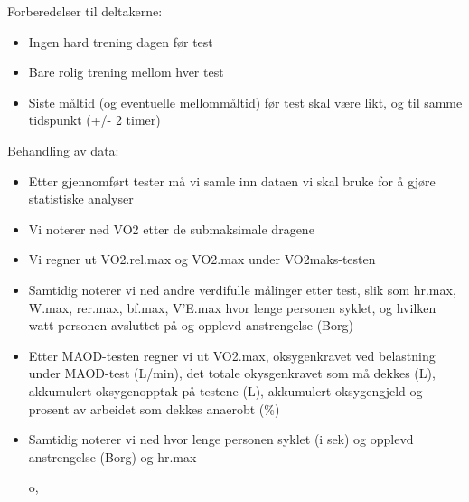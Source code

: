 \documentclass[
  letterpaper,
  DIV=11,
  numbers=noendperiod]{scrartcl}
\providecommand{\tightlist}{%
  \setlength{\itemsep}{0pt}\setlength{\parskip}{0pt}}\usepackage{longtable,booktabs,array}
\begin{document}
Forberedelser til deltakerne:

\begin{itemize}
\tightlist
\item
  Ingen hard trening dagen før test
\item
  Bare rolig trening mellom hver test
\item
  Siste måltid (og eventuelle mellommåltid) før test skal være likt, og
  til samme tidspunkt (+/- 2 timer)
\end{itemize}

Behandling av data:

\begin{itemize}
\item
  Etter gjennomført tester må vi samle inn dataen vi skal bruke for å
  gjøre statistiske analyser
\item
  Vi noterer ned VO2 etter de submaksimale dragene
\item
  Vi regner ut VO2.rel.max og VO2.max under VO2maks-testen
\item
  Samtidig noterer vi ned andre verdifulle målinger etter test, slik som
  hr.max, W.max, rer.max, bf.max, V'E.max hvor lenge personen syklet, og
  hvilken watt personen avsluttet på og opplevd anstrengelse (Borg)
\item
  Etter MAOD-testen regner vi ut VO2.max, oksygenkravet ved belastning
  under MAOD-test (L/min), det totale okysgenkravet som må dekkes (L),
  akkumulert oksygenopptak på testene (L), akkumulert oksygengjeld og
  prosent av arbeidet som dekkes anaerobt (\%)
\item
  Samtidig noterer vi ned hvor lenge personen syklet (i sek) og opplevd
  anstrengelse (Borg) og hr.max

  o,
\end{itemize}
\end{document}
